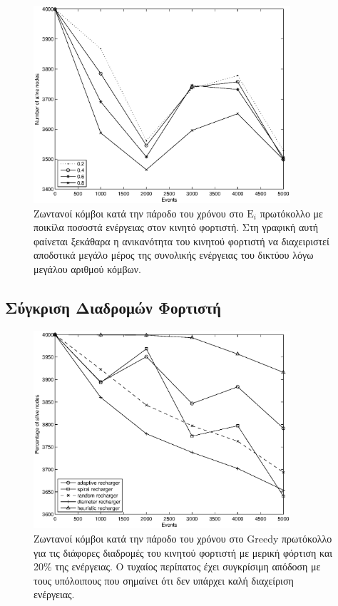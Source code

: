 \begin{figure}[H]
  \centering
   \includegraphics[width=0.85\textwidth]{experiments/4000nodes/3.smallVSbigpercentage/alive_nodes_ei_rc_per_our.eps}
  \caption{Ζωντανοί κόμβοι κατά την πάροδο του χρόνου στο $\text{E}_{i}$ πρωτόκολλο με ποικίλα ποσοστά ενέργειας στον κινητό φορτιστή. Στη γραφική αυτή φαίνεται
ξεκάθαρα η ανικανότητα του κινητού φορτιστή να διαχειριστεί αποδοτικά μεγάλο μέρος της συνολικής ενέργειας του δικτύου λόγω μεγάλου αριθμού κόμβων.}
  \label{fig:5_3exp_1_3}
\end{figure}

\subsection{Σύγκριση Διαδρομών Φορτιστή}\label{subc:result6_4}
\begin{figure}[H]
  \centering
  \includegraphics[width=0.85\textwidth]{experiments/4000nodes/4.ourVSnaive/alive_nodes_greedy_rc_per_our-spiral-random-diameter-heuristic.eps}
  \caption{Ζωντανοί κόμβοι κατά την πάροδο του χρόνου στο Greedy πρωτόκολλο για τις διάφορες διαδρομές του κινητού φορτιστή με μερική φόρτιση και 20\% της
ενέργειας. Ο τυχαίος περίπατος έχει συγκρίσιμη απόδοση με τους υπόλοιπους που σημαίνει ότι δεν υπάρχει καλή διαχείριση ενέργειας.}
  \label{fig:5_4exp_1_1}
\end{figure}

